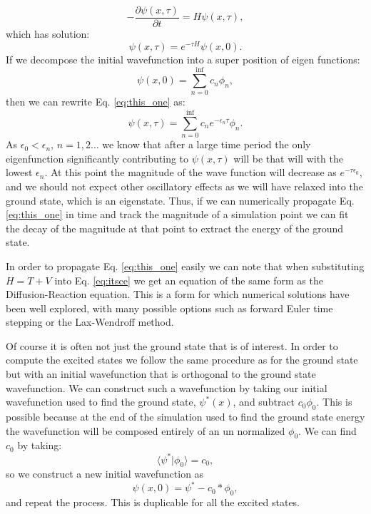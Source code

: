 \documentclass[]{article}
\begin{document}
\begin{equation}
-\frac{\partial\psi(x,\tau)}{\partial t} = H\psi(x,\tau),
\label{eq:itsce}
\end{equation}
which has solution:
\begin{equation}
\psi(x,\tau) = e^{-\tau H}\psi(x,0).
\label{eq:this_one}
\end{equation}
If we decompose the initial wavefunction into a super position of eigen functions:
\begin{equation}
\psi(x,0) = \sum_{n=0}^{\inf}c_n \phi_n,
\end{equation}
then we can rewrite Eq. \ref{eq:this_one} as:
\begin{equation}
\psi(x,\tau) = \sum_{n=0}^{\inf}c_n e^{-\epsilon_n \tau}\phi_n.
\end{equation}
As $\epsilon_0 < \epsilon_n\text{, }n=1,2\dots$ we know that after a large time period the only eigenfunction significantly contributing to $\psi(x,\tau)$ will be that will with the lowest $\epsilon_n$. At this point the magnitude of the wave function will decrease as $e^{-\tau \epsilon_0}$, and we should not expect other oscillatory effects as we will have relaxed into the ground state, which is an eigenstate. Thus, if we can numerically propagate Eq. \ref{eq:this_one} in time and track the magnitude of a simulation point we can fit the decay of the magnitude at that point to extract the energy of the ground state.



In order to propagate Eq. \ref{eq:this_one} easily we can note that when substituting $H=T + V$ into Eq. \ref{eq:itsce} we get an equation of the same form as the Diffusion-Reaction equation. This is a form for which numerical solutions have been well explored, with many possible options such as forward Euler time stepping or the Lax-Wendroff method.

Of course it is often not just the ground state that is of interest. In order to compute the excited states we follow the same procedure as for the ground state but with an initial wavefunction that is orthogonal to the ground state wavefunction. We can construct such a wavefunction by taking our initial wavefunction used to find the ground state, $\psi^*(x)$, and subtract $c_0 \phi_0$. This is possible because at the end of the simulation used to find the ground state energy the wavefunction will be composed entirely of an un normalized $\phi_0$. We can find $c_0$ by taking:
\begin{equation}
\langle \psi^* | \phi_0 \rangle = c_0,
\end{equation}  
so we construct a new initial wavefunction as 
\begin{equation}
	\psi(x,0) = \psi^* - c_0*\phi_0,
\end{equation} 
and repeat the process. This is duplicable for all the excited states.
\end{document}
